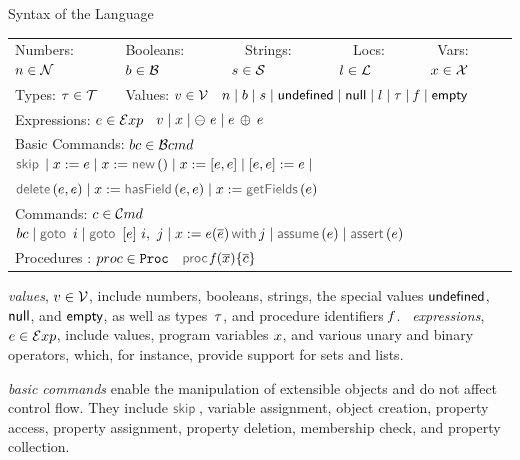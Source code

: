 \vspace{5pt}
\begin{display}{Syntax of the \jsil Language}{
\begin{tabular}{lllll}
	 Numbers: $n \in \mathcal{N}$ &  Booleans: $b \in \mathcal{B}$ & \  \ Strings: $s \in {\mathcal S}$ & \  \ Locs: $l \in {\mathcal L}$ & \  Vars: $x \in \mathcal{X}$ \\[0.1cm]
	Types: $\tau \in \mathcal{T}$ & \multicolumn{4}{l}{Values: $v \in \mathcal{V}$  \ $n \mid b \mid s \mid  {\sf undefined} \mid {\sf null} \mid l \mid \tau \mid \mathit{f} \mid {\sf empty}$} \\[0.1cm]
\multicolumn{5}{l}{Expressions: $e \in \mathcal{E}xp$  \ $v \mid x \mid \ominus\ e \mid e \, \oplus_{} \, e $} \\[0.1cm]
	\multicolumn{5}{l}{Basic Commands: $bc \in \mathcal{B}cmd$ \ $\jsilskip \mid \jvar := \jsilexpr  \mid \jvar := \jsilnew() \mid \jvar := [\jsilexpr, \jsilexpr] \mid [\jsilexpr, \jsilexpr] := \jsilexpr \mid$} \\[0.1cm]
	\multicolumn{5}{l}{\hspace{2.8cm} $\jsildelete(\jsilexpr, \jsilexpr) \mid \jvar := \hasfield(\jsilexpr, \jsilexpr) \mid \jvar := \getfields(\jsilexpr)$} \\[0.1cm]
	\multicolumn{5}{l}{Commands: $c \in \mathcal{C}md$  \ $ \bcmd \mid \goto \ i \mid  \ifgoto{\jsilexpr}{i}{j} \mid \jsilcall{\jvar}{\jsilexpr}{\jvec{\jsilexpr}}{j} 
	         \mid \assume(\jsilexpr) \mid \assert(\jsilexpr)$} \\[0.1cm]
	\multicolumn{5}{l}{Procedures : $proc \in \mathtt{Proc}$  \ $\procedure{\pid}{\jvec{\jvar}}{\jvec{\jcmd}}$}
 \end{tabular}}
\end{display}

\vspace{5pt}
\noindent \jsil \emph{values}, $v \in \mathcal{V}$, include numbers, booleans, strings, the special values ${\sf undefined}$, ${\sf null}$, and ${\sf empty}$, as well as types~$\tau$, and procedure identifiers $\mathit{f}$.
\jsil~\emph{expressions}, $e \in \mathcal{E}xp$, include \jsil values, \jsil program variables $x$, and various unary and binary operators, which, for instance, provide support for sets and lists. 

\jsil \emph{basic commands} enable the manipulation of extensible objects and do not affect control flow. 
They include $\jsilskip$, variable assignment, object creation, property access, property assignment, property deletion, membership check, and property collection. 

